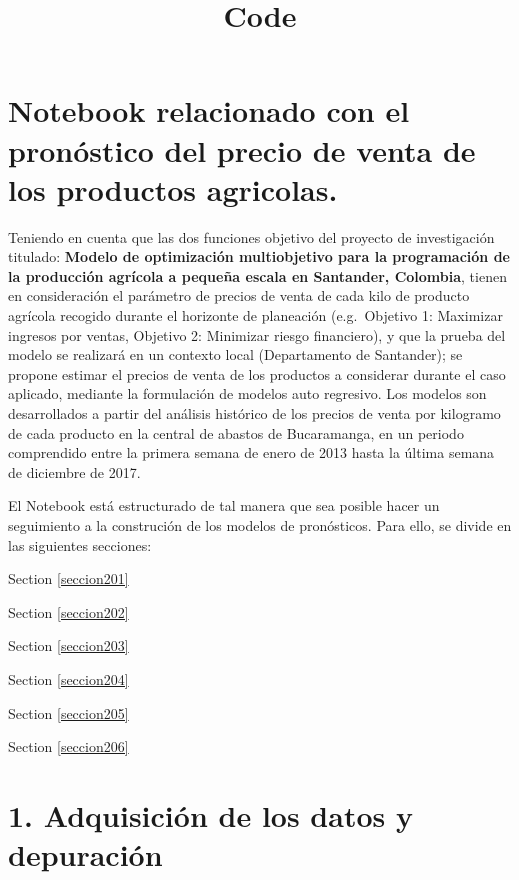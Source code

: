 \documentclass[11pt]{article}
\title{Code}
\begin{document}
    
    
    \maketitle
    
    

    
    \hypertarget{notebook-relacionado-con-el-pronuxf3stico-del-precio-de-venta-de-los-productos-agricolas.}{%
\section{Notebook relacionado con el pronóstico del precio de venta de
los productos
agricolas.}\label{notebook-relacionado-con-el-pronuxf3stico-del-precio-de-venta-de-los-productos-agricolas.}}

    Teniendo en cuenta que las dos funciones objetivo del proyecto de
investigación titulado: \textbf{Modelo de optimización multiobjetivo
para la programación de la producción agrícola a pequeña escala en
Santander, Colombia}, tienen en consideración el parámetro de precios de
venta de cada kilo de producto agrícola recogido durante el horizonte de
planeación (e.g.~Objetivo 1: Maximizar ingresos por ventas, Objetivo 2:
Minimizar riesgo financiero), y que la prueba del modelo se realizará en
un contexto local (Departamento de Santander); se propone estimar el
precios de venta de los productos a considerar durante el caso aplicado,
mediante la formulación de modelos auto regresivo. Los modelos son
desarrollados a partir del análisis histórico de los precios de venta
por kilogramo de cada producto en la central de abastos de Bucaramanga,
en un periodo comprendido entre la primera semana de enero de 2013 hasta
la última semana de diciembre de 2017.

    El Notebook está estructurado de tal manera que sea posible hacer un
seguimiento a la construción de los modelos de pronósticos. Para ello,
se divide en las siguientes secciones:

Section \ref{seccion201}

Section \ref{seccion202}

Section \ref{seccion203}

Section \ref{seccion204}

Section \ref{seccion205}

Section \ref{seccion206}

    \hypertarget{adquisiciuxf3n-de-los-datos-y-depuraciuxf3n}{%
\section{ 1. Adquisición de los datos y
depuración}\label{adquisiciuxf3n-de-los-datos-y-depuraciuxf3n}}
\end{document}
